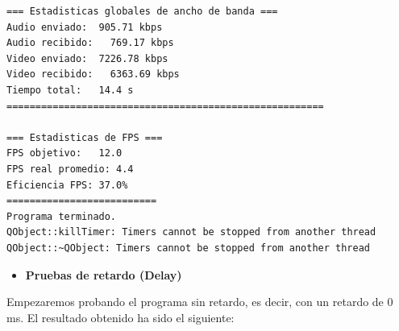 \begin{adjustbox}{max width=\textwidth}
\begin{lstlisting}[language=bash,basicstyle=\ttfamily\scriptsize]
=== Estadisticas globales de ancho de banda ===
Audio enviado:	905.71 kbps
Audio recibido:   769.17 kbps
Video enviado:	7226.78 kbps
Video recibido:   6363.69 kbps
Tiempo total: 	14.4 s
=======================================================

=== Estadisticas de FPS ===
FPS objetivo: 	12.0
FPS real promedio: 4.4
Eficiencia FPS:	37.0%
==========================
Programa terminado.
QObject::killTimer: Timers cannot be stopped from another thread
QObject::~QObject: Timers cannot be stopped from another thread
\end{lstlisting}
\end{adjustbox}
\vspace{\baselineskip}

\newpage

\begin{itemize}
    \item \textbf{Pruebas de retardo (Delay)}
\end{itemize}

Empezaremos probando el programa sin retardo, es decir, con un retardo de 0 ms. El resultado obtenido ha sido el siguiente:
\vspace{\baselineskip}

